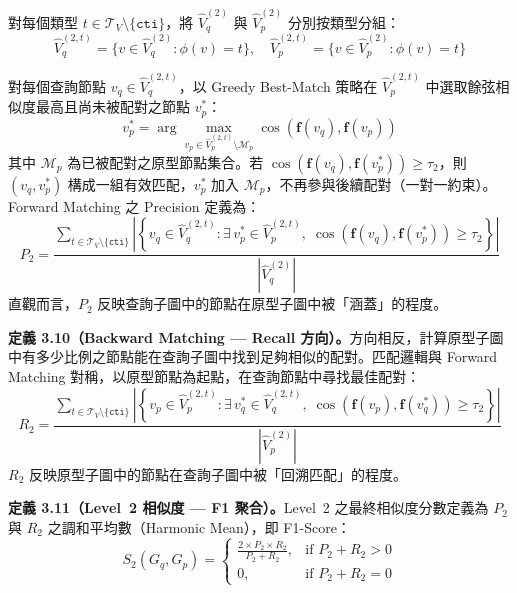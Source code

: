 \begin{ZhChapter}
對每個類型 $t \in \mathcal{T}_V \setminus \{\texttt{cti}\}$，將 $\hat{V}_q^{(2)}$ 與 $\hat{V}_p^{(2)}$ 分別按類型分組：
\begin{equation}
    \hat{V}_q^{(2,t)} = \{v \in \hat{V}_q^{(2)} : \phi(v) = t\}, \quad \hat{V}_p^{(2,t)} = \{v \in \hat{V}_p^{(2)} : \phi(v) = t\}
\end{equation}

對每個查詢節點 $v_q \in \hat{V}_q^{(2,t)}$，以 Greedy Best-Match 策略在 $\hat{V}_p^{(2,t)}$ 中選取餘弦相似度最高且尚未被配對之節點 $v_p^*$：
\begin{equation}
    v_p^* = \arg\max_{v_p \in \hat{V}_p^{(2,t)} \setminus \mathcal{M}_p} \cos(\mathbf{f}(v_q), \mathbf{f}(v_p))
    \label{eq:greedy-match}
\end{equation}
其中 $\mathcal{M}_p$ 為已被配對之原型節點集合。若 $\cos(\mathbf{f}(v_q), \mathbf{f}(v_p^*)) \geq \tau_2$，則 $(v_q, v_p^*)$ 構成一組有效匹配，$v_p^*$ 加入 $\mathcal{M}_p$，不再參與後續配對（一對一約束）。Forward Matching 之 Precision 定義為：
\begin{equation}
    P_2 = \frac{\displaystyle\sum_{t \in \mathcal{T}_V \setminus \{\texttt{cti}\}} \left|\left\{v_q \in \hat{V}_q^{(2,t)} : \exists\, v_p^* \in \hat{V}_p^{(2,t)},\; \cos(\mathbf{f}(v_q), \mathbf{f}(v_p^*)) \geq \tau_2\right\}\right|}{|\hat{V}_q^{(2)}|}
    \label{eq:l2-precision}
\end{equation}
直觀而言，$P_2$ 反映查詢子圖中的節點在原型子圖中被「涵蓋」的程度。

\noindent\textbf{定義 3.10（Backward Matching — Recall 方向）。}方向相反，計算原型子圖中有多少比例之節點能在查詢子圖中找到足夠相似的配對。匹配邏輯與 Forward Matching 對稱，以原型節點為起點，在查詢節點中尋找最佳配對：
\begin{equation}
    R_2 = \frac{\displaystyle\sum_{t \in \mathcal{T}_V \setminus \{\texttt{cti}\}} \left|\left\{v_p \in \hat{V}_p^{(2,t)} : \exists\, v_q^* \in \hat{V}_q^{(2,t)},\; \cos(\mathbf{f}(v_p), \mathbf{f}(v_q^*)) \geq \tau_2\right\}\right|}{|\hat{V}_p^{(2)}|}
    \label{eq:l2-recall}
\end{equation}
$R_2$ 反映原型子圖中的節點在查詢子圖中被「回溯匹配」的程度。

\noindent\textbf{定義 3.11（Level~2 相似度 — F1 聚合）。}Level~2 之最終相似度分數定義為 $P_2$ 與 $R_2$ 之調和平均數（Harmonic Mean），即 F1-Score：
\begin{equation}
    S_2(G_q, G_p) = \begin{cases} \displaystyle\frac{2 \times P_2 \times R_2}{P_2 + R_2}, & \text{if } P_2 + R_2 > 0 \\[8pt] 0, & \text{if } P_2 + R_2 = 0 \end{cases}
    \label{eq:level2}
\end{equation}


\end{ZhChapter}

